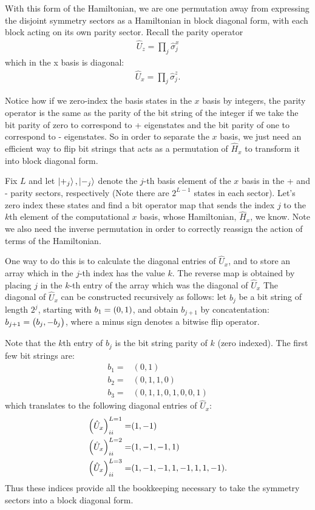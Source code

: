\documentclass{article}
\begin{document}
With this form of the Hamiltonian, we are one permutation away from expressing
the disjoint symmetry sectors as a Hamiltonian in block diagonal form, with each
block acting on its own parity sector.
Recall the parity operator 
\begin{align}
    \hat U_z = \prod_j \hat \sigma_{j}^x
\end{align}
which in the x basis is diagonal:
\begin{align}
    \hat U_x = \prod_j \hat \sigma_{j}^z.
\end{align}

Notice how if we zero-index the basis states in the $x$ basis by integers,
the parity operator is the same as the parity of the bit string of the integer
if we take the bit parity of zero to correspond to + eigenstates 
and the bit parity of one to correspond to - eigenstates.
So in order to separate the $x$ basis, we just need an efficient way to flip
bit strings that acts as a permutation of $\hat H_x$ to transform it into block
diagonal form.

Fix $L$ and let $\ket{+_j}, \ket{-_j}$ denote the $j$-th basis element of the
$x$ basis in the + and - parity sectors, respectively 
(Note there are $2^{L-1}$ states in each sector).
Let's zero index these states and find a bit operator map that sends the index
$j$ to the $k$th element of the computational $x$ basis, whose Hamiltonian,
$\hat H_x$, we know.
Note we also need the inverse permutation in order to correctly reassign the
action of terms of the Hamiltonian.

One way to do this is to calculate the diagonal entries of $\hat U_x$, 
and to store an array which in the $j$-th index has the value $k$.
The reverse map is obtained by placing $j$ in the $k$-th entry of the
array which was the diagonal of $\hat U_x$
The diagonal of $\hat U_x$ can be constructed recursively as follows:
let $b_j$ be a bit string of length $2^j$, starting with $b_1 = \qty( 0, 1 )$,
and obtain $b_{j+1}$ by concatentation: $b_{j+1} = \mqty( b_j, -b_j)$, where
a minus sign denotes a bitwise flip operator.

Note that the $k$th entry of $b_j$ is the bit string parity of $k$ (zero indexed).
The first few bit strings are:
\begin{align}
    b_1 =& (0, 1)
    \\
    b_2 =& (0, 1, 1, 0)
    \\
    b_3 =& (0, 1, 1, 0, 1, 0, 0, 1)
\end{align}
which translates to the following diagonal entries of $\hat U_x$:
\begin{align}
    \qty(\hat U_x)^{L=1}_{ii} =& (1, -1)
    \\
    \qty(\hat U_x)^{L=2}_{ii} =& (1, -1, -1, 1)
    \\
    \qty(\hat U_x)^{L=3}_{ii} =& (1, -1, -1, 1, -1, 1, 1, -1).
\end{align}
Thus these indices provide all the bookkeeping necessary to take the symmetry sectors
into a block diagonal form.
\end{document}
